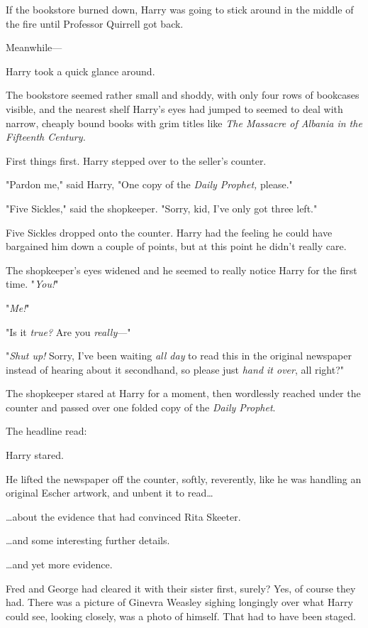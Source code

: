 If the bookstore burned down, Harry was going to stick around in the middle of 
the fire until Professor Quirrell got back.

Meanwhile---

Harry took a quick glance around.

The bookstore seemed rather small and shoddy, with only four rows of bookcases 
visible, and the nearest shelf Harry's eyes had jumped to seemed to deal with 
narrow, cheaply bound books with grim titles like \emph{The Massacre of Albania 
in the Fifteenth Century.}

First things first. Harry stepped over to the seller's counter.

"Pardon me," said Harry, "One copy of the \emph{Daily Prophet,} please."

"Five Sickles," said the shopkeeper. "Sorry, kid, I've only got three left."

Five Sickles dropped onto the counter. Harry had the feeling he could have 
bargained him down a couple of points, but at this point he didn't really care.

The shopkeeper's eyes widened and he seemed to really notice Harry for the 
first time. "\emph{You!}"

"\emph{Me!}"

"Is it \emph{true?} Are you \emph{really}---"

"\emph{Shut up!} Sorry, I've been waiting \emph{all day} to read this in the 
original newspaper instead of hearing about it secondhand, so please just 
\emph{hand it over}, all right?"

The shopkeeper stared at Harry for a moment, then wordlessly reached under the 
counter and passed over one folded copy of the \emph{Daily Prophet}.

The headline read:


Harry stared.

He lifted the newspaper off the counter, softly, reverently, like he was 
handling an original Escher artwork, and unbent it to read{\ldots}

{\ldots}about the evidence that had convinced Rita Skeeter.

{\ldots}and some interesting further details.

{\ldots}and yet more evidence.

Fred and George had cleared it with their sister first, surely? Yes, of course 
they had. There was a picture of Ginevra Weasley sighing longingly over what 
Harry could see, looking closely, was a photo of himself. That had to have been 
staged.

